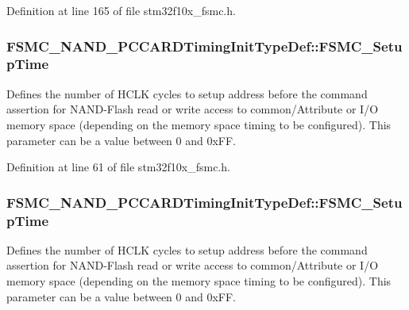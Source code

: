 Definition at line 165 of file stm32f10x\+\_\+fsmc.\+h.

\subsubsection[{\texorpdfstring{F\+S\+M\+C\+\_\+\+Setup\+Time}{FSMC_SetupTime}}]{ F\+S\+M\+C\+\_\+\+N\+A\+N\+D\+\_\+\+P\+C\+C\+A\+R\+D\+Timing\+Init\+Type\+Def\+::\+F\+S\+M\+C\+\_\+\+Setup\+Time}\hypertarget{struct_f_s_m_c___n_a_n_d___p_c_c_a_r_d_timing_init_type_def_a2f2f96aec515be3723d00001b0e48588}{}\label{struct_f_s_m_c___n_a_n_d___p_c_c_a_r_d_timing_init_type_def_a2f2f96aec515be3723d00001b0e48588}
Defines the number of H\+C\+LK cycles to setup address before the command assertion for N\+A\+N\+D-\/\+Flash read or write access to common/\+Attribute or I/O memory space (depending on the memory space timing to be configured). This parameter can be a value between 0 and 0x\+FF. 

Definition at line 61 of file stm32f10x\+\_\+fsmc.\+h.

\subsubsection[{\texorpdfstring{F\+S\+M\+C\+\_\+\+Setup\+Time}{FSMC_SetupTime}}]{ F\+S\+M\+C\+\_\+\+N\+A\+N\+D\+\_\+\+P\+C\+C\+A\+R\+D\+Timing\+Init\+Type\+Def\+::\+F\+S\+M\+C\+\_\+\+Setup\+Time}\hypertarget{struct_f_s_m_c___n_a_n_d___p_c_c_a_r_d_timing_init_type_def_a31632aeb49269a29a39e3b191590b6dc}{}\label{struct_f_s_m_c___n_a_n_d___p_c_c_a_r_d_timing_init_type_def_a31632aeb49269a29a39e3b191590b6dc}
Defines the number of H\+C\+LK cycles to setup address before the command assertion for N\+A\+N\+D-\/\+Flash read or write access to common/\+Attribute or I/O memory space (depending on the memory space timing to be configured). This parameter can be a value between 0 and 0x\+FF. 

